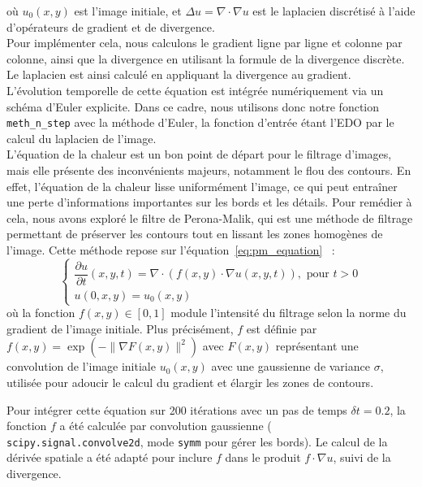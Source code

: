 \documentclass{article}
\begin{document}
où \( u_0(x,y) \) est l'image initiale, et \( \Delta u = \nabla \cdot \nabla u \) est le laplacien discrétisé à l'aide d'opérateurs de gradient et de divergence.\\
Pour implémenter cela, nous calculons le gradient ligne par ligne et colonne par colonne, ainsi que la divergence en utilisant la formule de la divergence discrète. Le laplacien est ainsi calculé en appliquant la divergence au gradient.\\
L’évolution temporelle de cette équation est intégrée numériquement via un schéma d’Euler explicite. Dans ce cadre, nous utilisons donc notre fonction \texttt{meth\_n\_step} avec la méthode d'Euler, la fonction d'entrée étant l'EDO par le calcul du laplacien de l’image.\\
L'équation de la chaleur est un bon point de départ pour le filtrage d'images, mais elle présente des inconvénients majeurs, notamment le flou des contours. En effet, l'équation de la chaleur lisse uniformément l'image, ce qui peut entraîner une perte d'informations importantes sur les bords et les détails. Pour remédier à cela, nous avons exploré le filtre de Perona-Malik, qui est une méthode de filtrage permettant de préserver les contours tout en lissant les zones homogènes de l'image. Cette méthode repose sur l'équation~\ref{eq:pm_equation}~\cite{is104-perona} :
\begin{equation}
  \label{eq:pm_equation}
  \begin{cases}
  \dfrac{\partial u}{\partial t}(x,y,t) = \nabla \cdot \left( f(x,y) \cdot \nabla u(x,y,t) \right), \text{ pour } t > 0 \\
  u(0,x,y) = u_0(x,y)
  \end{cases}
\end{equation}
où la fonction \( f(x,y) \in [0,1] \) module l’intensité du filtrage selon la norme du gradient de l’image initiale. Plus précisément, \( f \) est définie par \( f(x,y) = \exp\left( -\| \nabla F(x,y) \|^2 \right) \) avec \( F(x,y) \) représentant une convolution de l'image initiale \( u_0(x,y) \) avec une gaussienne de variance \( \sigma \), utilisée pour adoucir le calcul du gradient et élargir les zones de contours.

Pour intégrer cette équation sur 200 itérations avec un pas de temps \( \delta t = 0.2 \), la fonction \( f \) a été calculée par convolution gaussienne (\texttt{\\scipy.signal.convolve2d}, mode \texttt{symm} pour gérer les bords). Le calcul de la dérivée spatiale a été adapté pour inclure \( f \) dans le produit \( f \cdot \nabla u \), suivi de la divergence.
\end{document}
